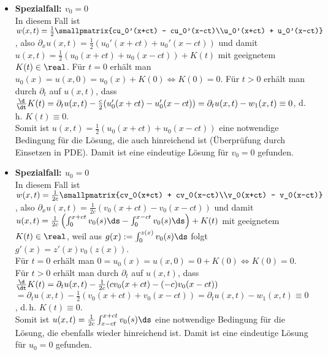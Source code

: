 \linie

\begin{Bem}
    \begin{itemize}
        \item
        \textbf{Spezialfall: $v_0 = 0$}\\
        In diesem Fall ist
        $w(x, t) = \frac{1}{2} \smallpmatrix{cu_0'(x+ct) - cu_0'(x-ct)\\u_0'(x+ct) + u_0'(x-ct)}$,
        also $\partial_x u(x, t) = \frac{1}{2} (u_0'(x+ct) + u_0'(x-ct))$ und damit
        $u(x, t) = \frac{1}{2} (u_0(x+ct) + u_0(x-ct)) + K(t)$ mit geeignetem $K(t) \in \real$.
        Für $t = 0$ erhält man $u_0(x) = u(x, 0) = u_0(x) + K(0) \iff K(0) = 0$.
        Für $t > 0$ erhält man durch $\partial_t$ auf $u(x, t)$, dass
        $\frac{\d}{\dt} K(t) = \partial_t u(x, t) - \frac{c}{2} (u_0'(x+ct) - u_0'(x-ct))
        = \partial_t u(x, t) - w_1(x, t) \equiv 0$,
        d.\,h. $K(t) \equiv 0$.\\
        Somit ist $u(x, t) = \frac{1}{2} (u_0(x+ct) + u_0(x-ct))$ eine notwendige Bedingung
        für die Lösung, die auch hinreichend ist (Überprüfung durch Einsetzen in PDE).
        Damit ist eine eindeutige Lösung für $v_0 = 0$ gefunden.
        
        \item
        \textbf{Spezialfall: $u_0 = 0$}\\
        In diesem Fall ist
        $w(x, t) = \frac{1}{2c} \smallpmatrix{cv_0(x+ct) + cv_0(x-ct)\\v_0(x+ct) - v_0(x-ct)}$,
        also $\partial_x u(x, t) = \frac{1}{2c} (v_0(x+ct) - v_0(x-ct))$ und damit
        $u(x, t) = \frac{1}{2c} \left(\int_0^{x+ct} v_0(s) \ds - \int_0^{x-ct} v_0(s) \ds\right)
        + K(t)$ mit geeignetem $K(t) \in \real$,
        weil aus $g(x) := \int_0^{z(x)} v_0(s) \ds$ folgt $g'(x) = z'(x) v_0(z(x))$.\\
        Für $t = 0$ erhält man $0 = u_0(x) = u(x, 0) = 0 + K(0) \iff K(0) = 0$.
        Für $t > 0$ erhält man durch $\partial_t$ auf $u(x, t)$, dass
        $\frac{\d}{\dt} K(t) = \partial_t u(x, t) - \frac{1}{2c} (c v_0(x+ct) - (-c) v_0(x-ct))$\\
        $= \partial_t u(x, t) - \frac{1}{2} (v_0(x+ct) + v_0(x-ct))
        = \partial_t u(x, t) - w_1(x, t) \equiv 0$,
        d.\,h. $K(t) \equiv 0$.\\
        Somit ist $u(x, t) = \frac{1}{2c} \int_{x-ct}^{x+ct} v_0(s) \ds$ eine notwendige Bedingung
        für die Lösung, die ebenfalls wieder hinreichend ist.
        Damit ist eine eindeutige Lösung für $u_0 = 0$ gefunden.
    \end{itemize}
\end{Bem}

